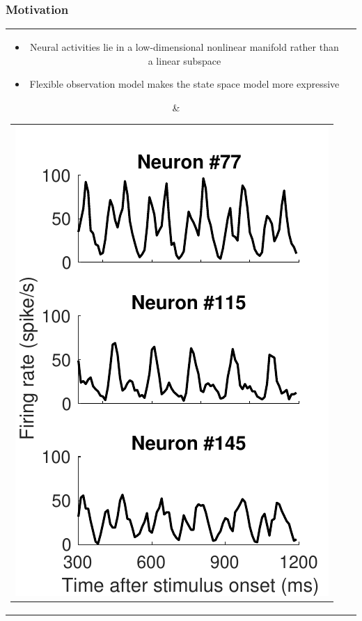 \documentclass[16pt,presentation]{beamer}
\begin{document}
\begin{frame}
\frametitle{Motivation}
\begin{tabular}{cl}
\parbox{0.6\textwidth}{
\begin{itemize}
\item Neural activities lie in a low-dimensional \alert{nonlinear manifold} rather than a \alert{linear subspace}
\item Flexible observation model makes the state space model more expressive
\end{itemize}
}
&
\hspace{-1cm}
\begin{tabular}{c}
\includegraphics[scale=0.5,clip = true]{figs/flds/fig_V1_single_3concat_onlyobservation.pdf}
\end{tabular}
\end{tabular}
\end{frame}
\end{document}
